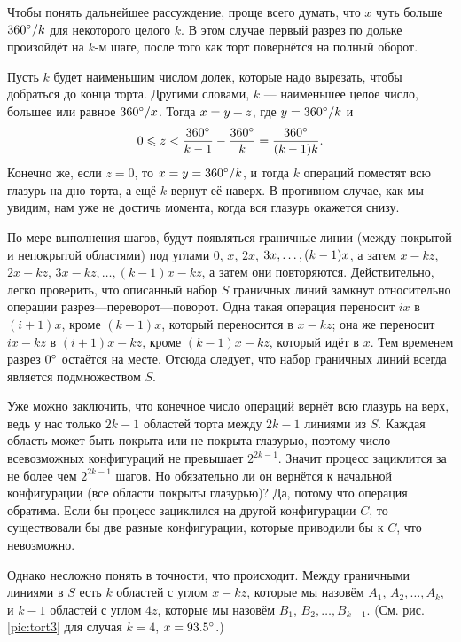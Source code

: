 Чтобы понять дальнейшее рассуждение, проще всего думать, что $x$ чуть больше $360\degree/k$ для некоторого целого $k$.
В этом случае первый разрез по дольке произойдёт на $k$-м шаге, после того как торт повернётся на полный оборот.

Пусть $k$ будет наименьшим числом долек, которые надо вырезать, чтобы добраться до конца торта.
Другими словами, $k$ --- наименьшее целое число, большее или равное $360\degree/x$.
Тогда $x \z= y + z$, где $y = 360\degree/k$ и 
\[0\leqslant z <\frac{360\degree}{k-1}-\frac{360\degree}{k}=\frac{360\degree}{(k-1)k}.\]
Конечно же, если $z = 0$, то $x = y = 360\degree/k$, и тогда $k$ операций поместят всю глазурь на дно торта, а ещё $k$ вернут её наверх.
В противном случае, как мы увидим, нам уже не достичь момента, когда вся глазурь окажется снизу.

По мере выполнения шагов, будут появляться граничные линии (между покрытой и непокрытой областями) под углами $0$, $x$, $2x$, $3x, \z\dots , (k - 1)x$, а затем $x - kz$, $2x - kz$, $3x - kz, \dots , (k - 1)x - kz$,
а затем они повторяются.
Действительно, легко проверить, что описанный набор $S$ граничных линий замкнут относительно операции разрез---переворот---поворот.
Одна такая операция переносит $ix$ в $(i + 1)x$, кроме $(k - 1)x$, который переносится в $x - kz$;
она же переносит $ix - kz$ в $(i + 1)x - kz$, кроме $(k - 1)x - kz$, который идёт в $x$.
Тем временем разрез $0\degree$ остаётся на месте.
Отсюда следует, что набор граничных линий всегда является подмножеством $S$.

Уже можно заключить, что конечное число операций вернёт всю глазурь на верх, ведь у нас только $2k - 1$ областей торта между $2k - 1$ линиями из $S$.
Каждая область может быть покрыта или не покрыта глазурью, поэтому число всевозможных конфигураций не превышает $2^{2k-1}$.
Значит процесс зациклится за не более чем $2^{2k-1}$ шагов.
Но обязательно ли он вернётся к начальной конфигурации (все области покрыты глазурью)?
Да, потому что операция обратима.
Если бы процесс зациклился на другой конфигурации $C$, то существовали бы две разные конфигурации, которые приводили бы к $C$, что невозможно.

Однако несложно понять в точности, что происходит.
Между граничными линиями в $S$ есть $k$ областей с углом $x - kz$, которые мы назовём $A_1$, $A_2, \dots , A_k$, и $k - 1$ областей с углом $4z$, которые мы назовём $B_1$, $B_2, \dots , B_{k-1}$.
(См. рис. \ref{pic:tort3} для случая $k = 4$, $x = 93.5\degree$.)

